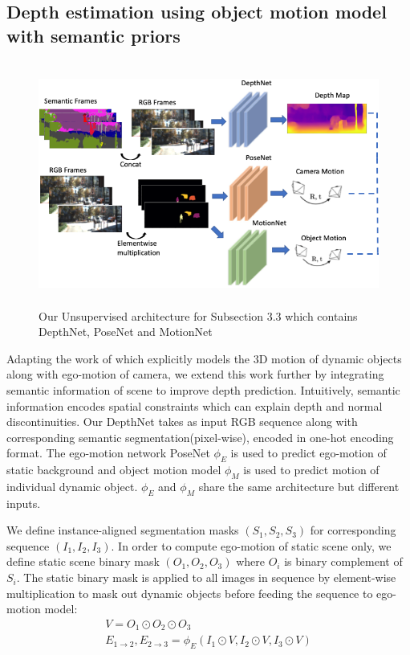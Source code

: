 \documentclass[10pt,twocolumn,letterpaper]{article}
\begin{document}

\subsection{Depth estimation using object motion model with semantic priors}

\begin{figure}
    \centering
    \includegraphics[width=\linewidth, height=8cm]{architecture.png}
    \caption{Our Unsupervised architecture for Subsection 3.3 which contains DepthNet, PoseNet and MotionNet}
    \label{fig:arch}
\end{figure}

Adapting the work of \cite{casser2018depth} which explicitly models the 3D motion of dynamic objects along with ego-motion of camera, we extend this work further by integrating semantic information of scene to improve depth prediction. Intuitively, semantic information encodes spatial constraints which can explain depth and normal discontinuities. Our DepthNet takes as input RGB sequence along with corresponding semantic segmentation(pixel-wise), encoded in one-hot encoding format. The ego-motion network PoseNet $\phi_{E}$ is used to predict ego-motion of static background and object motion model $\phi_{M}$ is used to predict motion of individual dynamic object. $\phi_{E}$ and $\phi_{M}$ share the same architecture but different inputs. 

We define instance-aligned segmentation masks $(S_{1}, S_{2}, S_{3})$ for corresponding sequence $(I_{1}, I_{2}, I_{3})$. In order to compute ego-motion of static scene only, we define static scene binary mask $(O_{1}, O_{2}, O_{3})$ where $O_{i}$ is binary complement of $S_{i}$. The static binary mask is applied to all images in sequence by element-wise multiplication to mask out dynamic objects before feeding the sequence to ego-motion model:
\begin{multline}
    V = O_{1} \odot O_{2} \odot O_{3} 
    \\
 E_{1\rightarrow2}, E_{2\rightarrow3} = \phi_{E}(I_{1} \odot V, I_{2} \odot V, I_{3} \odot V) 
\end{multline}
\end{document}
